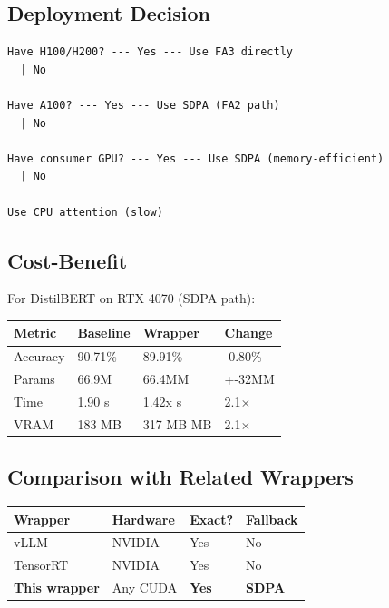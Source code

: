 \subsection{Deployment Decision}

\begin{lstlisting}
Have H100/H200? --- Yes --- Use FA3 directly
  | No
   
Have A100? --- Yes --- Use SDPA (FA2 path)
  | No
   
Have consumer GPU? --- Yes --- Use SDPA (memory-efficient)
  | No
   
Use CPU attention (slow)
\end{lstlisting}

\subsection{Cost-Benefit}

For DistilBERT on RTX 4070 (SDPA path):

\begin{table}[H]
\centering
\small
\begin{tabular}{llll}
\toprule
\textbf{Metric} & \textbf{Baseline} & \textbf{Wrapper} & \textbf{Change} \\
\midrule
Accuracy & 90.71\% & 89.91\% & -0.80\% \\
Params & 66.9M & 66.4MM & +-32MM \\
Time & 1.90 s & 1.42x s & 2.1$\times$ \\
VRAM & 183 MB & 317 MB MB & 2.1$\times$ \\
\bottomrule
\end{tabular}
\end{table}

\subsection{Comparison with Related Wrappers}

\begin{table}[H]
\centering
\small
\begin{tabular}{llll}
\toprule
\textbf{Wrapper} & \textbf{Hardware} & \textbf{Exact?} & \textbf{Fallback} \\
\midrule
vLLM & NVIDIA & Yes & No \\
TensorRT & NVIDIA & Yes & No \\
\textbf{This wrapper} & Any CUDA & \textbf{Yes} & \textbf{SDPA} \\
\bottomrule
\end{tabular}
\end{table}

